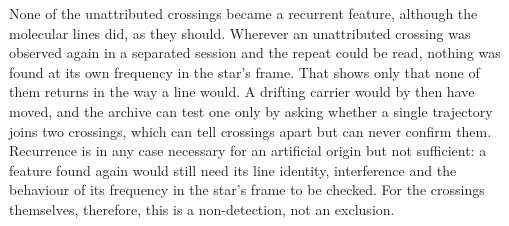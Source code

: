 None of the unattributed crossings became a recurrent feature, although
the molecular lines did, as they should. Wherever an unattributed
crossing was observed again in a separated session and the repeat could be
read, nothing was found at its own frequency in the star's frame. That shows
only that none of them returns in the way a line would. A drifting carrier
would by then have moved, and the archive can test one only by asking
whether a single trajectory joins two crossings, which can tell crossings
apart but can never confirm them. Recurrence is in any case necessary for an
artificial origin but not sufficient: a feature found again would still need
its line identity, interference and the behaviour of its frequency in the
star's frame to be checked. For the crossings themselves, therefore,
this is a non-detection, not an exclusion.

